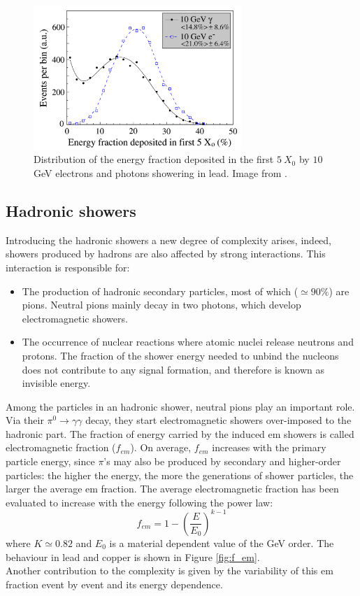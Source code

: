 \begin{figure}
	\centering
	\includegraphics[width=0.7\textwidth]{IMG/Cap2/em_start.png}
	\caption{Distribution of the energy fraction deposited in the first $5\ X_0$ by  $10$ GeV electrons and photons showering in lead. Image from \cite{Wigmans_e_gamma}.}
	\label{fig:em_start}
\end{figure}

\subsection{Hadronic showers} \label{subsec:had_shower}
Introducing the hadronic showers a new degree of complexity arises, indeed, showers produced by hadrons are also affected by strong interactions. This interaction is responsible for:
\begin{itemize}
    \item The production of hadronic secondary particles, most of which ($\simeq 90\%$) are pions. Neutral pions mainly decay in two photons, which develop electromagnetic showers.
    \item The occurrence of nuclear reactions where atomic nuclei release neutrons and protons. The fraction of the shower energy needed to unbind the nucleons does not contribute to any signal formation, and therefore is known as invisible energy.
\end{itemize}

Among the particles in an hadronic shower, neutral pions play an important role. Via their $\pi^0\rightarrow \gamma\gamma$ decay, they start electromagnetic showers over-imposed to the hadronic part. The fraction of energy carried by the induced em showers is called electromagnetic fraction ($f_{em}$).
On average, $f_{em}$ increases with the primary particle energy, since $\pi$'s may also be produced by secondary and higher-order particles: the higher the energy, the more the generations of shower particles, the larger the average em fraction. The  average  electromagnetic fraction has been evaluated to increase with the energy following the power law:
\begin{equation}
    f_{em} = 1 - \left(\frac{E}{E_0}\right)^{k-1}
\end{equation}
where $K\simeq 0.82$ and $E_0$ is a material dependent value of the GeV order. The behaviour in lead and copper is shown in Figure \ref{fig:f_em}.\\
Another contribution to the complexity is given by the variability of this em fraction event by event and its energy dependence.\\

